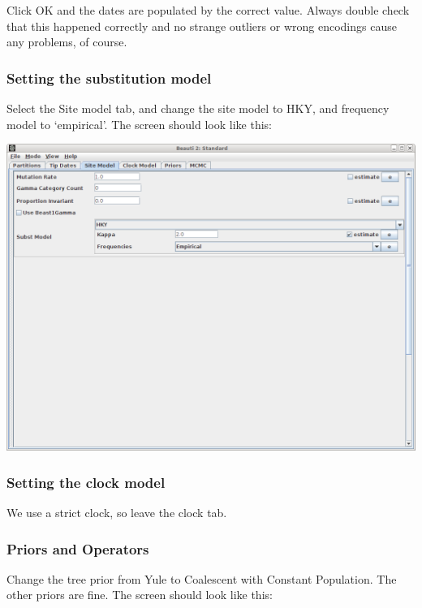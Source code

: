 \documentclass{article}
\begin{document}
Click OK and the dates are populated by the correct value. Always double check that this happened correctly and no strange outliers or wrong encodings cause any problems, of course.

\subsubsection*{Setting the substitution model}

Select the Site model tab, and change the site model to HKY, and frequency model to `empirical'.
The screen should look like this:

\includegraphics[scale=0.4,clip=true,trim=0 300 0 0]{figures/BEAUti_sitemodel.png}

\subsubsection*{Setting the clock model}

We use a strict clock, so leave the clock tab.

\subsubsection*{Priors and Operators}

Change the tree prior from Yule to Coalescent with Constant Population. The other priors are fine. The screen should look like this:
\end{document}
